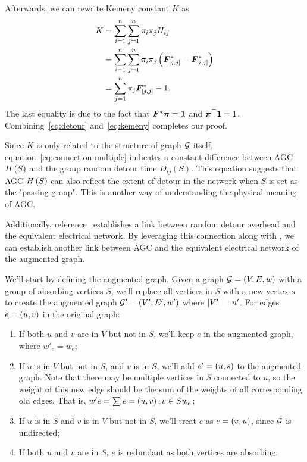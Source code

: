 \documentclass[10pt,journal,compsoc,twocolumn,twoside]{IEEEtran}
\begin{document}
\begin{IEEEproof}
    Afterwards, we can rewrite Kemeny constant \(K\) as
    \begin{equation}\label{eq:kemeny}
        \begin{split}
            K&=\sum_{i=1}^n\sum_{j=1}^n\pi_i\pi_jH_{ij}\\
            &=\sum_{i=1}^n\sum_{j=1}^n\pi_i\pi_j\left( \boldsymbol{F}^*_{[j,j]}-\boldsymbol{F}^*_{[i,j]} \right)\\
            &=\sum_{j=1}^n\pi_j\boldsymbol{F}^*_{[j,j]}-1.
        \end{split}
    \end{equation}
    The last equality is due to the fact that \(\boldsymbol{F}^*\boldsymbol{\pi}=\boldsymbol{1}\) and \(\boldsymbol{\pi}^\top\boldsymbol{1}=1\).
    Combining~\eqref{eq:detour} and~\eqref{eq:kemeny} completes our proof.
\end{IEEEproof}

Since \(K\) is only related to the structure of graph \(\mathcal{G}\) itself, equation~\eqref{eq:connection-multiple} indicates a constant difference between AGC \(H\left(S\right)\) and the group random detour time \(D_{ij}(S)\).
This equation suggests that AGC \(H\left(S\right)\) can also reflect the extent of detour in the network when \(S\) is set as the "passing group".
This is another way of understanding the physical meaning of AGC.

Additionally, reference~\cite{RaZh13} establishes a link between random detour overhead and the equivalent electrical network.
By leveraging this connection along with , we can establish another link between AGC and the equivalent electrical network of the augmented graph.

We'll start by defining the augmented graph.
Given a graph \(\mathcal{G}=\left( V,E,w \right)\) with a group of absorbing vertices \(S\), we'll replace all vertices in \(S\) with a new vertex \(s\) to create the augmented graph \(\mathcal{G}'=\left( V',E',w' \right)\) where \(\left|V' \right|=n'\).
For edges \(e=\left( u,v \right)\) in the original graph:
\begin{enumerate}
    \item If both \(u\) and \(v\) are in \(V\) but not in \(S\), we'll keep \(e\) in the augmented graph, where \(w'_e=w_e\);
    \item If \(u\) is in \(V\) but not in \(S\), and \(v\) is in \(S\), we'll add \(e'=\left( u,s \right)\) to the augmented graph. Note that there may be multiple vertices in \(S\) connected to \(u\), so the weight of this new edge should be the sum of the weights of all corresponding old edges. That is, \(w'e=\sum\limits{e=\left( u,v \right),v\in S}w_e\);
    \item If \(u\) is in \(S\) and \(v\) is in \(V\) but not in \(S\), we'll treat \(e\) as \(e=\left( v,u \right)\), since \(\mathcal{G}\) is undirected;
    \item If both \(u\) and \(v\) are in \(S\), \(e\) is redundant as both vertices are absorbing.
\end{enumerate}
\end{document}
